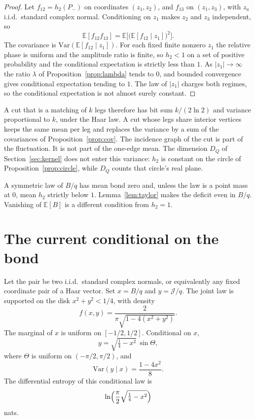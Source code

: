 \begin{proof}
Let \(f_{12}=h_2(P_-)\) on coordinates \((z_1,z_2)\), and \(f_{13}\) on
\((z_1,z_3)\), with \(z_a\) i.i.d.\ standard complex normal.
Conditioning on \(z_1\) makes \(z_2\) and \(z_3\) independent, so
\[
\mathbb{E}[f_{12}f_{13}]
=\mathbb{E}\bigl[\bigl(\mathbb{E}[f_{12}\mid z_1]\bigr)^2\bigr].
\]
The covariance is \(\mathrm{Var}(\mathbb{E}[f_{12}\mid z_1])\).
For each fixed finite nonzero \(z_1\) the relative phase is uniform and
the amplitude ratio is finite, so \(h_2<1\) on a set of positive
probability and the conditional expectation is strictly less than \(1\).
As \(|z_1|\to\infty\) the ratio \(\lambda\) of
Proposition~\ref{prop:lambda} tends to \(0\), and bounded convergence
gives conditional expectation tending to \(1\).
The law of \(|z_1|\) charges both regimes, so the conditional expectation
is not almost surely constant.
\end{proof}

A cut that is a matching of \(k\) legs therefore has bit sum
\(k/(2\ln 2)\) and variance proportional to \(k\), under the Haar law.
A cut whose legs share interior vertices keeps the same mean per leg and
replaces the variance by a sum of the covariances of
Proposition~\ref{prop:cov}.
The incidence graph of the cut is part of the fluctuation.
It is not part of the one-edge mean.
The dimension \(D_Q\) of Section~\ref{sec:kernel} does not enter this
variance: \(h_2\) is constant on the circle of Proposition~\ref{prop:circle},
while \(D_Q\) counts that circle's real plane.

A symmetric law of \(B/q\) has mean bond zero and, unless the law is a
point mass at \(0\), mean \(h_2\) strictly below \(1\).
Lemma~\ref{lem:taylor} makes the deficit even in \(B/q\).
Vanishing of \(\mathbb{E}[B]\) is a different condition from
\(h_2=1\).

\section{The current conditional on the bond}
\label{sec:condJ}

\begin{theorem}
\label{thm:condJ}
Let the pair be two i.i.d.\ standard complex normals, or equivalently
any fixed coordinate pair of a Haar vector.
Set \(x=B/q\) and \(y=\mathcal{J}/q\).
The joint law is supported on the disk \(x^2+y^2<1/4\), with density
\[
f(x,y)=\frac{2}{\pi\sqrt{1-4(x^2+y^2)}}.
\]
The marginal of \(x\) is uniform on \([-1/2,1/2]\).
Conditional on \(x\),
\[
y=\sqrt{\tfrac14-x^2}\,\sin\Theta,
\]
where \(\Theta\) is uniform on \((-\pi/2,\pi/2)\), and
\[
\mathrm{Var}(y\mid x)=\frac{1-4x^2}{8}.
\]
The differential entropy of this conditional law is
\[
\ln\Bigl(\frac{\pi}{2}\sqrt{\tfrac14-x^2}\Bigr)
\]
nats.
\end{theorem}

